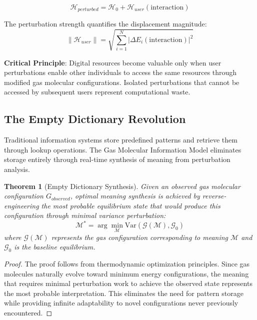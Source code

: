 \documentclass[12pt,a4paper]{article}
\newtheorem{theorem}{Theorem}
\begin{document}
\begin{equation}
\mathcal{H}_{perturbed} = \mathcal{H}_0 + \mathcal{H}_{user}(\text{interaction})
\end{equation}

The perturbation strength quantifies the displacement magnitude:
\begin{equation}
\|\mathcal{H}_{user}\| = \sqrt{\sum_{i=1}^{N} \left|\Delta E_i(\text{interaction})\right|^2}
\end{equation}

\textbf{Critical Principle}: Digital resources become valuable only when user perturbations enable other individuals to access the same resources through modified gas molecular configurations. Isolated perturbations that cannot be accessed by subsequent users represent computational waste.

\subsection{The Empty Dictionary Revolution}

Traditional information systems store predefined patterns and retrieve them through lookup operations. The Gas Molecular Information Model eliminates storage entirely through real-time synthesis of meaning from perturbation analysis.

\begin{theorem}[Empty Dictionary Synthesis]
Given an observed gas molecular configuration $G_{observed}$, optimal meaning synthesis is achieved by reverse-engineering the most probable equilibrium state that would produce this configuration through minimal variance perturbation:
\begin{equation}
\mathcal{M}^* = \arg\min_{\mathcal{M}} \text{Var}(\mathcal{G}(\mathcal{M}), \mathcal{G}_0)
\end{equation}
where $\mathcal{G}(\mathcal{M})$ represents the gas configuration corresponding to meaning $\mathcal{M}$ and $\mathcal{G}_0$ is the baseline equilibrium.
\end{theorem}

\begin{proof}
The proof follows from thermodynamic optimization principles. Since gas molecules naturally evolve toward minimum energy configurations, the meaning that requires minimal perturbation work to achieve the observed state represents the most probable interpretation. This eliminates the need for pattern storage while providing infinite adaptability to novel configurations never previously encountered.
\end{proof}
\end{document}
